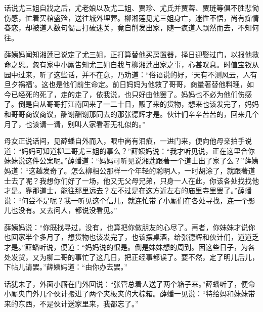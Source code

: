 
\begin{parag}

    话说尤三姐自戕之后，尤老娘以及尤二姐、贾珍、尤氏并贾蓉、贾琏等俱不胜悲恸伤感，忙着买棺盛殓，送往城外埋葬。柳湘莲见尤三姐身亡，迷性不悟，尚有痴情眷恋，却被道人数句偈言打破迷关，竟自削发出家，随一疯道人飘然而去，不知何往。
\end{parag}


\begin{parag}


    薛姨妈闻知湘莲已说定了尤三姐，正打算替他买房置器，择日迎娶过门，以报他救命之恩。忽有家中小厮吿知尤三姐自戕与柳湘莲出家之事，心甚叹息。时值宝钗从园中过来，听了这些话，并不在意，乃劝道：“俗语说的好，‘天有不测风云，人有旦夕祸福’。这也是他们前生命定。前日妈妈为他救了哥哥，商量著替他料理，如今已经死的死了，走的走了，依我说，也只好由他罢了。妈妈也不必为他们伤感了。倒是自从哥哥打江南回来了一二十日，贩了来的货物，想来也该发完了，妈妈和哥哥商议商议，酬谢酬谢那同去的那张德辉才是。伙计们辛辛苦苦的，回来几个月了，也该请一请，别叫人家看著无礼似的。”
\end{parag}


\begin{parag}


    母女正说话间，见薛蟠自外而入，眼中尚有泪痕，一进门来，便向他母亲拍手说道：“妈妈可知道柳二哥尤三姐的事么？”薛姨妈说：“我才听见说，正在这里合你妹妹说这件公案呢。”薛蟠道：“妈妈可听见说湘莲跟著一个道士出了家了么？”薛姨妈道：“这越发奇了。怎么柳相公那样一个年轻的聪明人，一时胡涂了，就跟著道士去了呢？我想你们好了一场，他又无父母兄弟，只身一人在此，你该各处找找他才是。靠那道士，能往那里远去？左不过是在这方近左右的庙里寺里罢了。”薛蟠说：“何尝不是呢？我一听见这个信儿，就连忙带了小厮们在各处寻找，连一个影儿也没有。又去问人，都说没看见。”
\end{parag}


\begin{parag}


    薛姨妈说：“你既找寻过，没有，也算把你做朋友的心尽了。再者，你妹妹才说你也回家半个多月了，想货物也该发完了，也该摆桌酒，给张德辉和伙计们，道道乏才是。”薛蟠听说，便道：“妈妈说的很是。倒是妹妹想的周到。因这些日子，为各处发货，又为柳二哥的事忙了这几日，把正经事都误了。要不然，定了明儿后儿，下帖儿请罢。”薛姨妈道：“由你办去罢。”
\end{parag}


\begin{parag}


    话犹未了，外面小厮在门外回说：“张管总着人送了两个箱子来。”薛蟠听了，便命小厮央门外几个伙计搬进了两个夹板夹的大棕箱。薛蟠一见说：“特给妈和妹妹带来的东西，不是伙计送家里来，我都忘了。”
\end{parag}



